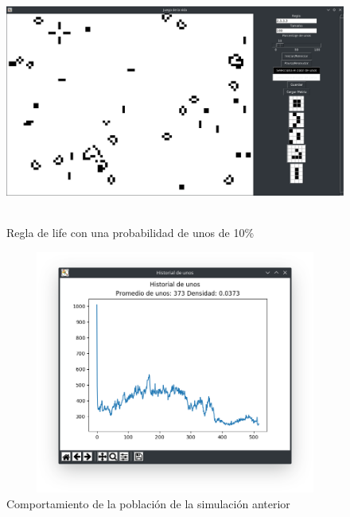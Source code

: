 \begin{figure}[H]
\begin{center}
 \includegraphics[width=12cm, height=8cm]{./img/life10.png}
 \caption{Regla de life con una probabilidad de unos de 10\%}
 \label{fig:life10}
\end{center}
\end{figure}

\begin{figure}[H]
\begin{center}
 \includegraphics[width=12cm, height=8cm]{./img/life10grafica.png}
 \caption{Comportamiento de la población de la simulación anterior}
 \label{fig:life10grafica}
\end{center}
\end{figure}

